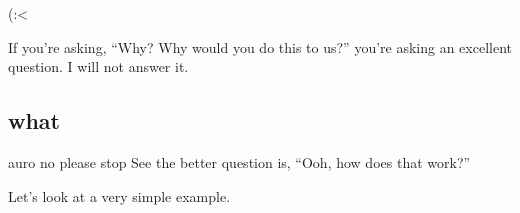\documentclass{beamer}
\begin{document}
\begin{frame}[fragile]{(:<}
\begin{onlyenv}
			\pause

			If you're asking, ``Why? Why would you do this to us?'' you're asking an excellent
			question. \pause I will not answer it.
		\end{onlyenv}
	\end{frame}

	\subsection{what}
	\begin{frame}{auro no please stop}
		See the better question is, ``Ooh, how does that work?'' \\

		\pause

		Let's look at a very simple example.
	\end{frame}
\end{document}
